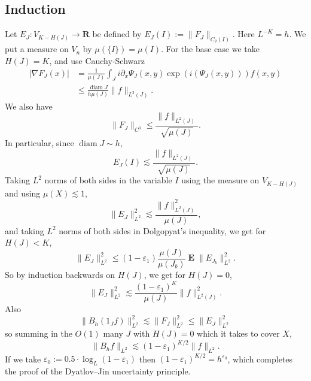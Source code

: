 \documentclass[reqno,12pt]{amsart}
\newcommand{\RR}{\mathbf{R}}
\DeclareMathOperator*{\Expect}{\mathbf E}
\DeclareMathOperator{\diam}{diam}
\theoremstyle{definition}
\numberwithin{equation}{section}
\begin{document}
\subsection{Induction}
Let $E_J: V_{K - H(J)} \to \RR$ be defined by $E_J(I) := \|F_J\|_{C_\theta(I)}$.
Here $L^{-K} = h$. We put a measure on $V_n$ by $\mu(\{I\}) = \mu(I)$.
For the base case we take $H(J) = K$, and use Cauchy-Schwarz
\begin{align*}
|\nabla F_J(x)| &= \frac{1}{\mu(J)}\int_J i\partial_x \Psi_J(x, y) \exp(i(\Psi_J(x, y))) f(x, y) \\
&\le \frac{\diam J}{h \mu(J)} \|f\|_{L^2(J)}.
\end{align*}
We also have 
$$\|F_J\|_{C^0} \le \frac{\|f\|_{L^2(J)}}{\sqrt{\mu(J)}}.$$
In particular, since $\diam J \sim h$,
$$E_J(I) \lesssim \frac{\|f\|_{L^2(J)}}{\sqrt{\mu(J)}}.$$
Taking $L^2$ norms of both sides in the variable $I$ using the measure on $V_{K - H(J)}$ and using $\mu(X) \lesssim 1$,
$$\|E_J\|_{L^2}^2 \lesssim \frac{\|f\|_{L^2(J)}^2}{\mu(J)},$$
and taking $L^2$ norms of both sides in Dolgopyat's inequality, we get for $H(J) < K$,
$$\|E_J\|_{L^2}^2 \leq (1 - \varepsilon_1) \frac{\mu(J)}{\mu(J_b)} \Expect \|E_{J_b}\|_{L^2}^2.$$
So by induction backwards on $H(J)$, we get for $H(J) = 0$,
$$\|E_J\|_{L^2}^2 \lesssim \frac{(1 - \varepsilon_1)^K}{\mu(J)} \|f\|_{L^2(J)}^2.$$
Also
$$\|B_h(1_J f)\|_{L^2}^2 \lesssim \|F_J\|_{L^2}^2 \leq \|E_J\|_{L^2}^2$$
so summing in the $O(1)$ many $J$ with $H(J) = 0$ which it takes to cover $X$,
$$\|B_h f\|_{L^2} \lesssim (1 - \varepsilon_1)^{K/2} \|f\|_{L^2}.$$
If we take $\varepsilon_0 := 0.5 \cdot \log_L (1 - \varepsilon_1)$ then $(1 - \varepsilon_1)^{K/2} = h^{\varepsilon_0}$, which completes the proof of the Dyatlov--Jin uncertainty principle.





\end{document}
